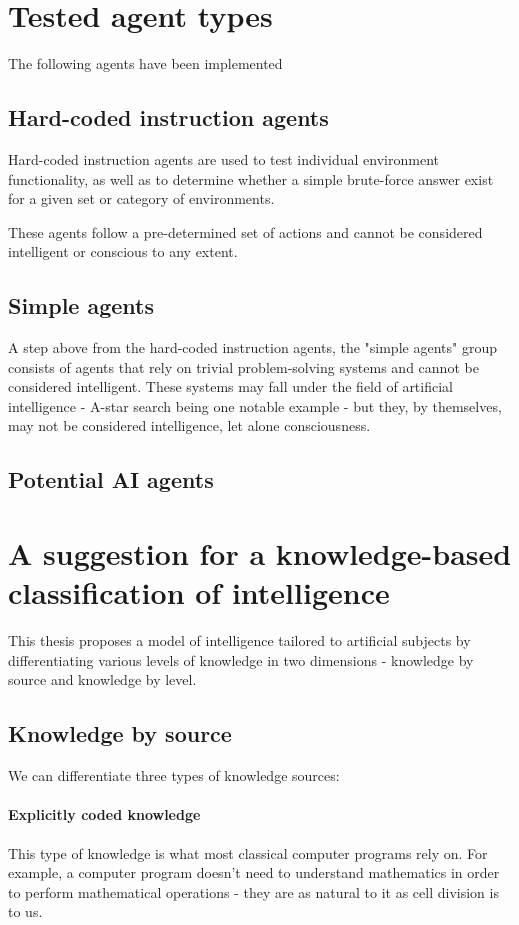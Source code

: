 \documentclass[masterthesis]{fer}
\begin{document}
\section{Tested agent types}
The following agents have been implemented
\subsection{Hard-coded instruction agents}
Hard-coded instruction agents are used to test individual environment functionality, as well as to determine whether a simple brute-force answer exist for a given set or category of environments.

These agents follow a pre-determined set of actions and cannot be considered intelligent or conscious to any extent.
\subsection{Simple agents}
A step above from the hard-coded instruction agents, the "simple agents" group consists of agents that rely on trivial problem-solving systems and cannot be considered intelligent.
These systems may fall under the field of artificial intelligence - A-star search being one notable example -
but they, by themselves, may not be considered intelligence, let alone consciousness.
\subsection{Potential AI agents}
\section{A suggestion for a knowledge-based classification of intelligence}
This thesis proposes a model of intelligence tailored to artificial subjects
by differentiating various levels of knowledge in two dimensions - knowledge by source and knowledge by level.
\subsection{Knowledge by source}
We can differentiate three types of knowledge sources:
\paragraph{Explicitly coded knowledge}
This type of knowledge is what most classical computer programs rely on. For example, a computer program doesn't need to understand mathematics in order to perform mathematical operations - they are as natural to it as cell division is to us.
\end{document}
